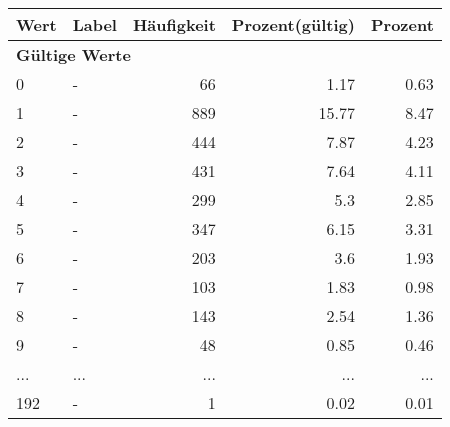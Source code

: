      \begin{longtable}{lXrrr}
     \toprule
     \textbf{Wert} & \textbf{Label} & \textbf{Häufigkeit} & \textbf{Prozent(gültig)} & \textbf{Prozent} \\
     \endhead
     \midrule
     \multicolumn{5}{l}{\textbf{Gültige Werte}}\\
        0 & \multicolumn{1}{X}{-} & %
          \num{66} &
          \num[round-mode=places,round-precision=2]{1,17} &
          \num[round-mode=places,round-precision=2]{0,63} \\
        1 & \multicolumn{1}{X}{-} & %
          \num{889} &
          \num[round-mode=places,round-precision=2]{15,77} &
          \num[round-mode=places,round-precision=2]{8,47} \\
        2 & \multicolumn{1}{X}{-} & %
          \num{444} &
          \num[round-mode=places,round-precision=2]{7,87} &
          \num[round-mode=places,round-precision=2]{4,23} \\
        3 & \multicolumn{1}{X}{-} & %
          \num{431} &
          \num[round-mode=places,round-precision=2]{7,64} &
          \num[round-mode=places,round-precision=2]{4,11} \\
        4 & \multicolumn{1}{X}{-} & %
          \num{299} &
          \num[round-mode=places,round-precision=2]{5,3} &
          \num[round-mode=places,round-precision=2]{2,85} \\
        5 & \multicolumn{1}{X}{-} & %
          \num{347} &
          \num[round-mode=places,round-precision=2]{6,15} &
          \num[round-mode=places,round-precision=2]{3,31} \\
        6 & \multicolumn{1}{X}{-} & %
          \num{203} &
          \num[round-mode=places,round-precision=2]{3,6} &
          \num[round-mode=places,round-precision=2]{1,93} \\
        7 & \multicolumn{1}{X}{-} & %
          \num{103} &
          \num[round-mode=places,round-precision=2]{1,83} &
          \num[round-mode=places,round-precision=2]{0,98} \\
        8 & \multicolumn{1}{X}{-} & %
          \num{143} &
          \num[round-mode=places,round-precision=2]{2,54} &
          \num[round-mode=places,round-precision=2]{1,36} \\
        9 & \multicolumn{1}{X}{-} & %
          \num{48} &
          \num[round-mode=places,round-precision=2]{0,85} &
          \num[round-mode=places,round-precision=2]{0,46} \\
       ... & ... & ... & ... & ... \\
        192 & \multicolumn{1}{X}{-} & %
          \num{1} &
          \num[round-mode=places,round-precision=2]{0,02} &
          \num[round-mode=places,round-precision=2]{0,01} \\


\end{longtable}
